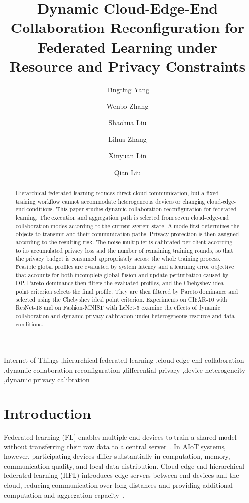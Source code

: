 \documentclass[5p,times]{elsarticle}
\theoremstyle{plain}
\theoremstyle{definition}
\theoremstyle{remark}
\begin{document}
\begin{frontmatter}

\title{Dynamic Cloud-Edge-End Collaboration Reconfiguration for Federated Learning under Resource and Privacy Constraints}

\author[bupt]{Tingting Yang}
\author[bupt]{Wenbo Zhang}
\author[bupt]{Shaohua Liu}
\author[bupt]{Lihua Zhang}
\author[bupt]{Xinyuan Lin}
\author[bupt]{Qian Liu}


\begin{abstract}
Hierarchical federated learning reduces direct cloud communication, but a fixed training workflow cannot accommodate heterogeneous devices or changing cloud-edge-end conditions.
 This paper studies dynamic collaboration reconfiguration for federated learning. 
 The execution and aggregation path is selected from seven cloud-edge-end collaboration modes according to the current system state.
 A mode first determines the objects to transmit and their communication paths. Privacy protection is then assigned according to the resulting risk.
The noise multiplier is calibrated per client according to its accumulated privacy loss and the number of remaining training rounds, so that the privacy budget is consumed appropriately across the whole training process.
Feasible global profiles are evaluated by system latency and a learning
error objective that accounts for both incomplete global fusion and update
perturbation caused by DP. Pareto dominance then filters the evaluated
profiles, and the Chebyshev ideal point criterion selects the final profile. They are then filtered by Pareto dominance and selected
using the Chebyshev ideal point criterion. 
Experiments on CIFAR-10 with ResNet-18 and on Fashion-MNIST with LeNet-5 examine the effects of dynamic collaboration and dynamic privacy calibration under heterogeneous resource and data conditions.
\end{abstract}

\begin{keyword} 
Internet of Things \sep hierarchical federated learning \sep cloud-edge-end collaboration \sep dynamic collaboration reconfiguration \sep differential privacy \sep device heterogeneity \sep dynamic privacy calibration
\end{keyword}

\end{frontmatter}
\section{Introduction}
\label{sec:introduction}
Federated learning (FL) enables multiple end devices to train a shared model
without transferring their raw data to a central server~\cite{fedavg}. In AIoT
systems, however, participating devices differ substantially in computation,
memory, communication quality, and local data distribution. Cloud-edge-end
hierarchical federated learning (HFL) introduces edge servers between end devices
and the cloud, reducing communication over long distances and providing additional computation and aggregation capacity~\cite{hfl}.
\end{document}
